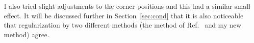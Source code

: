 I also tried slight adjustments to the corner positions and this had a
similar small effect.  It will be discussed further in
Section~\ref{sec:cond} that it is also noticeable that regularization
by two different methods (the method of Ref.~\cite{bea}
and my new method) agree.





